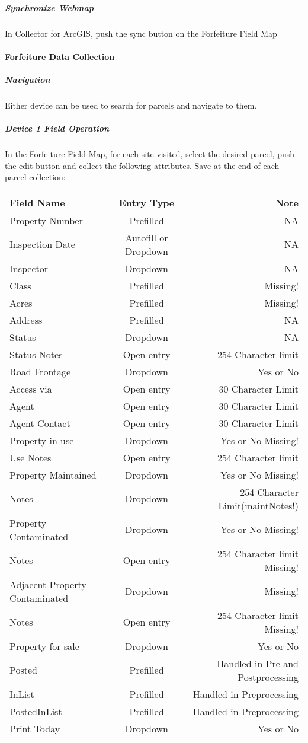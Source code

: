 \documentclass[class=article , crop=false, titlepage, twoside, multi={itemize, figure, verbatim}, float=false]{standalone}
\begin{document}
\subparagraph{Synchronize Webmap}In Collector for ArcGIS, push the sync button on the Forfeiture Field Map 

\paragraph{Forfeiture Data Collection}

\subparagraph{Navigation}Either device can be used to search for parcels and navigate to them. 

\subparagraph{Device 1 Field Operation}In the Forfeiture Field Map, for each site visited, select the desired parcel, push the edit button and collect the following attributes.  Save at the end of each parcel collection:
\begin{table}[h!]

\begin{center}
\begin{tabular}{l|c|r}
Field Name&Entry Type&Note\\ \hline
Property Number&Prefilled&NA\\
Inspection Date&{\footnotesize Autofill or Dropdown}&NA\\
Inspector&Dropdown&NA\\
Class&Prefilled&Missing!\\
Acres&Prefilled&Missing!\\
Address&Prefilled&NA\\
Status&Dropdown&NA\\
Status Notes&Open entry&254 Character limit\\
Road Frontage&Dropdown&Yes or No\\
Access via&Open entry&30 Character Limit\\
Agent&Open entry&30 Character Limit\\
Agent Contact&Open entry&30 Character Limit\\
Property in use&Dropdown&Yes or No Missing!\\
Use Notes&Open entry&254 Character limit\\
Property Maintained&Dropdown&Yes or No Missing!\\
Notes&Dropdown&254 Character Limit(maintNotes!)\\
Property Contaminated&Dropdown&Yes or No Missing!\\
Notes&Open entry&254 Character limit Missing!\\
Adjacent Property Contaminated&Dropdown&Missing!\\
Notes&Open entry&254 Character limit Missing!\\
Property for sale&Dropdown&Yes or No\\
Posted&Prefilled&Handled in Pre and Postprocessing\\
InList&Prefilled&Handled in Preprocessing\\
PostedInList&Prefilled&Handled in Preprocessing\\
Print Today&Dropdown&Yes or No\\

\end{tabular}
\end{center}
\end{table}
\end{document}
